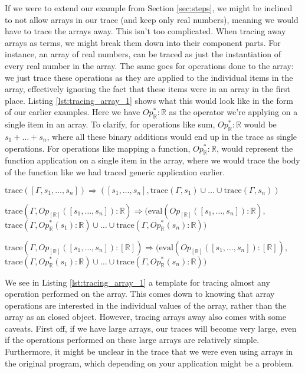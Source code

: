         If we were to extend our example from Section \ref{sec:steps}, we might be inclined to not allow arrays in our trace (and keep only real numbers), meaning we would have to trace the arrays away.
        This isn't too complicated.
        When tracing away arrays as terms, we might break them down into their component parts.
        For instance, an array of real numbers, can be traced as just the instantiation of every real number in the array.
        The same goes for operations done to the array: we just trace these operations as they are applied to the individual items in the array, effectively ignoring the fact that these items were in an array in the first place.
        Listing \ref{lst:tracing_array_1} shows what this would look like in the form of our earlier examples.
        Here we have $Op^*_\mathbb{R}:\mathbb{R}$ as the operator we're applying on a single item in an array.
        To clarify, for operations like sum, $Op^*_\mathbb{R}:\mathbb{R}$ would be $s_1+\dots+s_n$, where all these binary additions would end up in the trace as single operations.
        For operations like mapping a function, $Op^*_\mathbb{R}:\mathbb{R}$, would represent the function application on a single item in the array, where we would trace the body of the function like we had traced generic application earlier.

        \begin{quicklst}[caption=Tracing away arrays, label=lst:tracing_array_1, gobble=12]
            $\text{trace}([\Gamma,s_1,\dots,s_n])\Rightarrow([s_1,\dots,s_n],\text{trace}(\Gamma,s_1)\cup\dots\cup\text{trace}(\Gamma,s_n))$

            $\text{trace}(\Gamma,Op_{[\mathbb{R}]}([s_1,\dots,s_n]):\mathbb{R})\Rightarrow(\text{eval}(Op_{[\mathbb{R}]}([s_1,\dots,s_n]):\mathbb{R}),$
                $\text{trace}(\Gamma,Op^*_\mathbb{R}(s_1):\mathbb{R})\cup\dots\cup\text{trace}(\Gamma,Op^*_\mathbb{R}(s_n):\mathbb{R}))$

            $\text{trace}(\Gamma,Op_{[\mathbb{R}]}([s_1,\dots,s_n]):[\mathbb{R}])\Rightarrow(\text{eval}(Op_{[\mathbb{R}]}([s_1,\dots,s_n]):[\mathbb{R}]),$
                $\text{trace}(\Gamma,Op^*_\mathbb{R}(s_1):\mathbb{R})\cup\dots\cup\text{trace}(\Gamma,Op^*_\mathbb{R}(s_n):\mathbb{R}))$
        \end{quicklst}

        We see in Listing \ref{lst:tracing_array_1} a template for tracing almost any operation performed on the array.
        This comes down to knowing that array operations are interested in the individual values of the array, rather than the array as an closed object.
        However, tracing arrays away also comes with some caveats.
        First off, if we have large arrays, our traces will become very large, even if the operations performed on these large arrays are relatively simple.
        Furthermore, it might be unclear in the trace that we were even using arrays in the original program, which depending on your application might be a problem.


